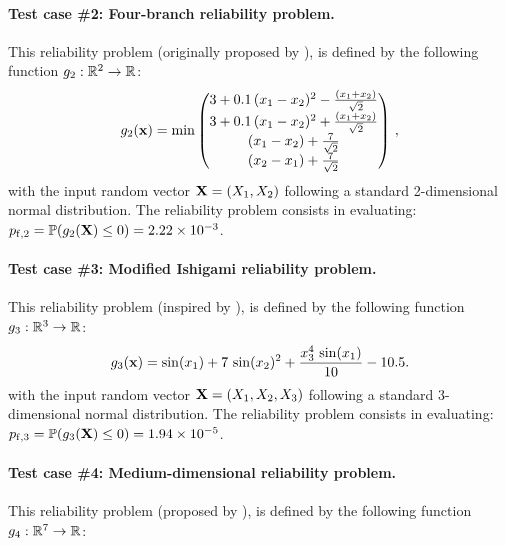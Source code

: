\paragraph{Test case \#2: Four-branch reliability problem.}
This reliability problem (originally proposed by \cite{waarts2000structural}), is defined by the following function $g_2: \mathbb{R}^2 \rightarrow \mathbb{R}$:
\begin{align}
  g_2({\bf x}) = \min \begin{pmatrix}
    3+0.1 \, (x_1-x_2)^2-\frac{(x_1+x_2)}{\sqrt{2}}\\
    3+0.1\, (x_1-x_2)^2+\frac{(x_1+x_2)}{\sqrt{2}}\\
    (x_1-x_2)+ \frac{7}{\sqrt{2}}\\
    (x_2-x_1)+ \frac{7}{\sqrt{2}}
  \end{pmatrix}\, ,
\end{align}
with the input random vector ${\bf X} = (X_1, X_2)$ following a standard 2-dimensional normal distribution. 
The reliability problem consists in evaluating: $p_{\mathrm{f}, 2} = \mathbb{P} ( g_2({\bf X}) \leq 0 ) =  2.22 \times 10^{-3}$.

\paragraph{Test case \#3: Modified Ishigami reliability problem.}
This reliability problem (inspired by \citealp{lemaitre_2015_PLI}), is defined by the following function $g_3: \mathbb{R}^3 \rightarrow \mathbb{R}$:
\begin{equation}
    g_3({\bf x}) = \sin(x_1) + 7 \, \sin(x_2)^2 + \frac{x_3^4 \, \sin(x_1)}{10} - 10.5.
\end{equation}
with the input random vector ${\bf X} = (X_1, X_2, X_3)$ following a standard 3-dimensional normal distribution. 
The reliability problem consists in evaluating: $p_{\mathrm{f}, 3} = \mathbb{P} ( g_3({\bf X}) \leq 0 ) =  1.94 \times 10^{-5}$.

\paragraph{Test case \#4: Medium-dimensional reliability problem.}
This reliability problem (proposed by \citealp{yun2018efficient}), is defined by the following function $g_4 : \mathbb{R}^7 \rightarrow \mathbb{R}$:

